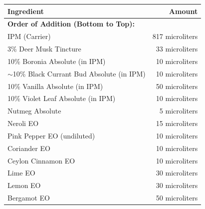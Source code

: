 \documentclass{article}
\begin{document}
\begin{center}
\begin{tabular}{p{6.5cm}r}
\toprule
\textcolor{colaRed}{\textbf{Ingredient}} & \textcolor{colaRed}{\textbf{Amount}} \\
\midrule
\multicolumn{2}{l}{\textcolor{violetPurple}{\textbf{Order of Addition (Bottom to Top):}}} \\
\midrule
IPM (Carrier) & 817 microliters \\
3\% Deer Musk Tincture & 33 microliters \\
10\% Boronia Absolute (in IPM) & 10 microliters \\
$\sim$10\% Black Currant Bud Absolute (in IPM) & 10 microliters \\
10\% Vanilla Absolute (in IPM) & 50 microliters \\
10\% Violet Leaf Absolute (in IPM) & 10 microliters \\
Nutmeg Absolute & 5 microliters \\
Neroli EO & 15 microliters \\
Pink Pepper EO (undiluted) & 10 microliters \\
Coriander EO & 10 microliters \\
Ceylon Cinnamon EO & 10 microliters \\
Lime EO & 30 microliters \\
Lemon EO & 30 microliters \\
Bergamot EO & 50 microliters \\
\bottomrule
\end{tabular}
\end{center}

\vspace{0.5cm}
\end{document}
